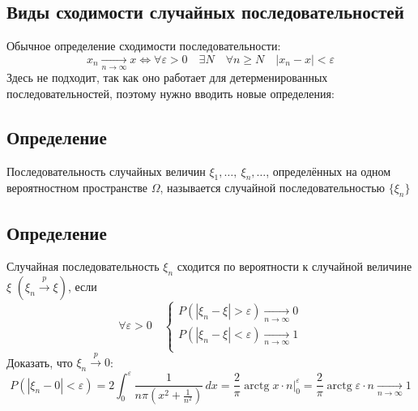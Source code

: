 \documentclass[12pt, a4paper]{article}
\begin{document}
    \subsection*{Виды сходимости случайных последовательностей}
    Обычное определение сходимости последовательности:
    \[x_n \xrightarrow[n\to \infty]{} x \Leftrightarrow \forall \varepsilon > 0\quad \exists N\quad \forall n \geq N\quad |x_n - x| < \varepsilon\]
    Здесь не подходит, так как оно работает для детерменированных последовательностей, поэтому нужно вводить новые определения:
    \subsection*{Определение}
    Последовательность случайных величин $\xi_1,\dots,\ \xi_n,\dots$, определённых на одном вероятностном пространстве $\Omega$, называется случайной последовательностью $\{\xi_n\}$
    \subsection*{Определение}
    Случайная последовательность $\xi_n$ сходится по вероятности к случайной величине $\xi$ $(\xi_n \xrightarrow{p}\xi)$, если 
    \[\forall \varepsilon > 0\quad \begin{cases}
        P(|\xi_n - \xi| > \varepsilon)\xrightarrow[n\to \infty]{} 0\\
        P(|\xi_n - \xi| < \varepsilon)\xrightarrow[n\to \infty]{} 1\\
    \end{cases}\]
    Доказать, что $\xi_n \xrightarrow{p} 0$:
    \[P(|\xi_n - 0| < \varepsilon) = 2\int_0^{\varepsilon} \frac{1}{n\pi(x^2 + \frac{1}{n^2})}\, dx = \frac{2}{\pi}\operatorname{arctg} x\cdot n |_0^{\varepsilon} = \frac{2}{\pi} \operatorname{arctg} \varepsilon \cdot n \xrightarrow[n\to \infty]{} 1\]
\end{document}
